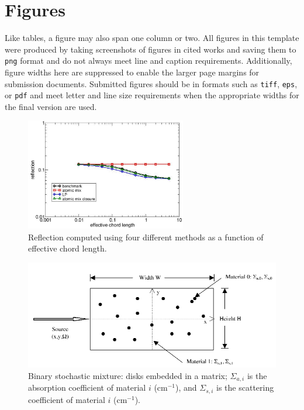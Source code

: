 \documentclass{nseJournal}
\begin{document}
\section{Figures}
\label{sec:figures}

Like tables, a figure may also span one column or two.
All figures in this template were produced by taking screenshots of figures in cited works and saving them to \texttt{png} format and do not always meet line and caption requirements.
Additionally, figure widths here are suppressed to enable the larger page margins for submission documents.
Submitted figures should be in formats such as \texttt{tiff}, \texttt{eps}, or \texttt{pdf} and meet letter and line size requirements when the appropriate widths for the final version are used.

\begin{figure}[t]%
  \centering
  \includegraphics[trim = 10mm 0mm 15mm 15mm, width=70mm]{AMClosure.PNG}
  \caption{Reflection computed using four different methods as a function of effective chord length.}
  \label{fig:AMClosure}
\end{figure}

\begin{figure}%
  \centering
  \includegraphics[trim = 10mm 0mm 10mm 0mm, width=140mm]{DonovanFig1.PNG}
  \caption{Binary stochastic mixture: disks embedded in a matrix; $\Sigma_{a,i}$ is the absorption coefficient of material $i$ (cm$^{-1}$), and $\Sigma_{s,i}$ is the scattering coefficient of material $i$ (cm$^{-1}$).}
  \label{fig:DonovanFig1}
\end{figure}
\end{document}
